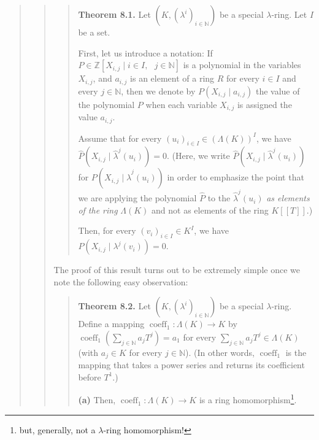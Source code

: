\documentclass[12pt,final,notitlepage,onecolumn,german]{article}%
\begin{document}
\begin{quote}
\begin{quote}
\begin{quote}
\bigskip

\textbf{Theorem 8.1.} Let $\left(  K,\left(  \lambda^{i}\right)
_{i\in\mathbb{N}}\right)  $ be a special $\lambda$-ring. Let $I$ be a set.

First, let us introduce a notation: If $P\in\mathbb{Z}\left[  X_{i,j}\mid i\in
I,\text{ }j\in\mathbb{N}\right]  $ is a polynomial in the variables $X_{i,j}$,
and $a_{i,j}$ is an element of a ring $R$ for every $i\in I$ and every
$j\in\mathbb{N}$, then we denote by $P\left(  X_{i,j}\mid a_{i,j}\right)  $
the value of the polynomial $P$ when each variable $X_{i,j}$ is assigned the
value $a_{i,j}$.

Assume that for every $\left(  u_{i}\right)  _{i\in I}\in\left(
\Lambda\left(  K\right)  \right)  ^{I}$, we have $\widehat{P}\left(
X_{i,j}\mid\widehat{\lambda}^{j}\left(  u_{i}\right)  \right)  =0$. (Here, we
write $\widehat{P}\left(  X_{i,j}\mid\widehat{\lambda}^{j}\left(
u_{i}\right)  \right)  $ for $P\left(  X_{i,j}\mid\widehat{\lambda}^{j}\left(
u_{i}\right)  \right)  $ in order to emphasize the point that we are applying
the polynomial $\widehat{P}$ to the $\widehat{\lambda}^{j}\left(
u_{i}\right)  $ \textit{as elements of the ring} $\Lambda\left(  K\right)  $
and not as elements of the ring $K\left[  \left[  T\right]  \right]  .$)

Then, for every $\left(  v_{i}\right)  _{i\in I}\in K^{I}$, we have $P\left(
X_{i,j}\mid\lambda^{j}\left(  v_{i}\right)  \right)  =0$.
\end{quote}

The proof of this result turns out to be extremely simple once we note the
following easy observation:

\begin{quote}
\textbf{Theorem 8.2.} Let $\left(  K,\left(  \lambda^{i}\right)
_{i\in\mathbb{N}}\right)  $ be a special $\lambda$-ring. Define a mapping
$\operatorname*{coeff}\nolimits_{1}:\Lambda\left(  K\right)  \rightarrow K$ by
$\operatorname*{coeff}\nolimits_{1}\left(  \sum\limits_{j\in\mathbb{N}}%
a_{j}T^{j}\right)  =a_{1}$ for every $\sum\limits_{j\in\mathbb{N}}a_{j}%
T^{j}\in\Lambda\left(  K\right)  $ (with $a_{j}\in K$ for every $j\in
\mathbb{N}$). (In other words, $\operatorname*{coeff}\nolimits_{1}$ is the
mapping that takes a power series and returns its coefficient before $T^{1}.$)

\textbf{(a)} Then, $\operatorname*{coeff}\nolimits_{1}:\Lambda\left(
K\right)  \rightarrow K$ is a ring homomorphism\footnote{but, generally, not a
$\lambda$-ring homomorphism!}.


\end{quote}
\end{quote}
\end{quote}
\end{document}
